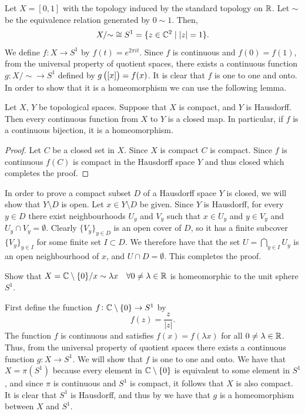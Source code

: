 \documentclass[11pt,a4paper]{article}
\begin{document}
\begin{example}
  Let $X = [0,1]$ with the topology induced by the standard topology on $\mathbb{R}$.
  Let $\sim$ be the equivalence relation generated by $0 \sim 1$.
  Then,
  \[
    {X}/{\sim} \cong S^1 =
    \{z \in \mathbb{C}^2 \mid |z| = 1\}.
  \]
  We define $f \colon X \to S^1$ by $f(t) = e^{2 \pi i t}$.
  Since $f$ is continuous and $f(0) = f(1)$, from the universal property
  of quotient spaces, there exists a continuous function 
  $g \colon {X}/{\sim} \to S^1$ defined by $g\del{[x]} = f(x)$.
  It is clear that $f$ is one to one and onto.
  In order to show that it is a homeomorphism we can use the following lemma.
  \begin{lemma}
    \label{lem:conditions-to-homeomorphism}
    Let $X$, $Y$ be topological spaces.
    Suppose that $X$ is compact, and $Y$ is Hausdorff.
    Then every continuous function from $X$ to $Y$ is a closed map.
    In particular, if $f$ is a continuous bijection, it is a homeomorphism.
  \end{lemma}
  \begin{proof}
    Let $C$ be a closed set in $X$.
    Since $X$ is compact $C$ is compact.
    Since $f$ is continuous $f(C)$ is compact in the Hausdorff space $Y$
    and thus closed which completes the proof.
  \end{proof}
  \begin{remark}
    In order to prove a compact subset $D$ of a Hausdorff space $Y$ is closed,
    we will show that $Y \setminus D$ is open.
    Let $x \in Y \setminus D$ be given.
    Since $Y$ is Hausdorff, for every $y \in D$ there exist neighbourhoods
    $U_y$ and $V_y$ such that $x \in U_y$ and $y \in V_y$ and
    $U_y \cap V_y = \emptyset$.
    Clearly $\{V_y\}_{y \in D}$ is an open cover of $D$, so it has
    a finite subcover $\{V_y\}_{y \in I}$ for some finite set $I \subset D$.
    We therefore have that the set $U = \bigcap_{y \in I} U_y$ is an open
    neighbourhood of $x$, and $U \cap D = \emptyset$.
    This completes the proof.
  \end{remark}
\end{example}

\begin{exercise}
  Show that
  $X = {\mathbb{C} \setminus \left\{0\right\}}/{x \sim \lambda x} \quad
  \forall 0 \neq \lambda \in \mathbb{R}$
  is homeomorphic to the unit sphere $S^1$.
\end{exercise}
\begin{solution}
  First define the function $f \colon \mathbb{C} \setminus \left\{0\right\} \to S^1$ by
  \[
    f(z) = \frac{z}{|z|}.
  \]
  The function $f$ is continuous and satisfies $f(x) = f(\lambda x)$ for all
  $0 \neq \lambda \in \mathbb{R}$.
  Thus, from the universal property of quotient spaces there exists
  a continuous function $g \colon X \to S^1$.
  We will show that $f$ is one to one and onto.
  We have that $X = \pi(S^1)$ because every element in $\mathbb{C} \setminus \left\{0\right\}$
  is equivalent to some element in $S^1$, and since $\pi$ is continuous
  and $S^1$ is compact, it follows that $X$ is also compact.
  It is clear that $S^1$ is Hausdorff, and thus by
  we have that $g$ is a homeomorphism between $X$ and $S^1$.
\end{solution}
\end{document}

